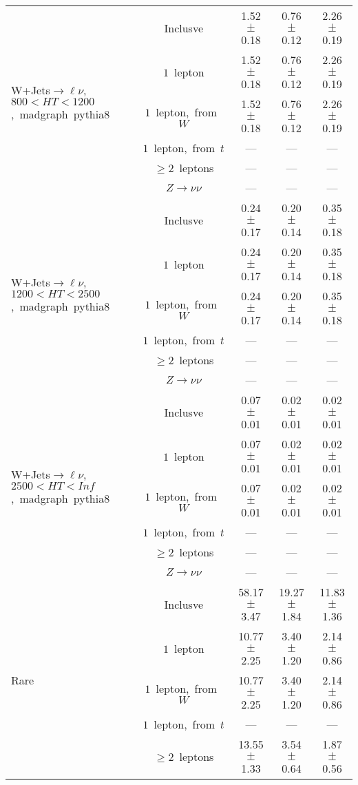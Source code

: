 \documentclass{article}
\begin{document}
\begin{longtable}{|l|c|c|c|c|}
\hline 
\multirow{6}{*}{W+Jets$\rightarrow\ell\nu$,~$800<HT<1200$,~madgraph~pythia8} & Inclusve  & 1.52 $\pm$ 0.18  & 0.76 $\pm$ 0.12  & 2.26 $\pm$ 0.19 \\* 
 & $1$~lepton  & 1.52 $\pm$ 0.18  & 0.76 $\pm$ 0.12  & 2.26 $\pm$ 0.19 \\* 
 & $1$~lepton,~from~$W$  & 1.52 $\pm$ 0.18  & 0.76 $\pm$ 0.12  & 2.26 $\pm$ 0.19 \\* 
 & $1$~lepton,~from~$t$  & ---  & ---  & --- \\* 
 & $\ge2$~leptons  & ---  & ---  & --- \\* 
 & $Z\rightarrow\nu\nu$  & ---  & ---  & --- \\* 
\hline 
\multirow{6}{*}{W+Jets$\rightarrow\ell\nu$,~$1200<HT<2500$,~madgraph~pythia8} & Inclusve  & 0.24 $\pm$ 0.17  & 0.20 $\pm$ 0.14  & 0.35 $\pm$ 0.18 \\* 
 & $1$~lepton  & 0.24 $\pm$ 0.17  & 0.20 $\pm$ 0.14  & 0.35 $\pm$ 0.18 \\* 
 & $1$~lepton,~from~$W$  & 0.24 $\pm$ 0.17  & 0.20 $\pm$ 0.14  & 0.35 $\pm$ 0.18 \\* 
 & $1$~lepton,~from~$t$  & ---  & ---  & --- \\* 
 & $\ge2$~leptons  & ---  & ---  & --- \\* 
 & $Z\rightarrow\nu\nu$  & ---  & ---  & --- \\* 
\hline 
\multirow{6}{*}{W+Jets$\rightarrow\ell\nu$,~$2500<HT<Inf$,~madgraph~pythia8} & Inclusve  & 0.07 $\pm$ 0.01  & 0.02 $\pm$ 0.01  & 0.02 $\pm$ 0.01 \\* 
 & $1$~lepton  & 0.07 $\pm$ 0.01  & 0.02 $\pm$ 0.01  & 0.02 $\pm$ 0.01 \\* 
 & $1$~lepton,~from~$W$  & 0.07 $\pm$ 0.01  & 0.02 $\pm$ 0.01  & 0.02 $\pm$ 0.01 \\* 
 & $1$~lepton,~from~$t$  & ---  & ---  & --- \\* 
 & $\ge2$~leptons  & ---  & ---  & --- \\* 
 & $Z\rightarrow\nu\nu$  & ---  & ---  & --- \\* 
\hline 
\multirow{6}{*}{Rare} & Inclusve  & 58.17 $\pm$ 3.47  & 19.27 $\pm$ 1.84  & 11.83 $\pm$ 1.36 \\* 
 & $1$~lepton  & 10.77 $\pm$ 2.25  & 3.40 $\pm$ 1.20  & 2.14 $\pm$ 0.86 \\* 
 & $1$~lepton,~from~$W$  & 10.77 $\pm$ 2.25  & 3.40 $\pm$ 1.20  & 2.14 $\pm$ 0.86 \\* 
 & $1$~lepton,~from~$t$  & ---  & ---  & --- \\* 
 & $\ge2$~leptons  & 13.55 $\pm$ 1.33  & 3.54 $\pm$ 0.64  & 1.87 $\pm$ 0.56 \\* 

\end{longtable}
\end{document}
